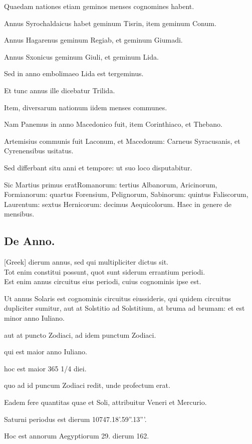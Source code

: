  Quaedam nationes etiam geminos menses cognomines habent.

Annus Syrochaldaicus habet geminum Tisrin, item geminum Conum.

Annus Hagarenus geminum Regiab, et geminum Giumadi.

Annus Sxonicus geminum Giuli, et geminum Lida.

Sed in
anno embolimaeo Lida est tergeminus.

Et tunc annus ille dicebatur
Trilida.

Item, diversarum nationum iidem menses communes.

Nam
Panemus in anno Macedonico fuit, item Corinthiaco, et Thebano.

Artemisius communis fuit Laconum, et Macedonum: Carneus Syracusanis,
et Cyrenensibus usitatus.

Sed differbant situ anni et tempore:
ut suo loco disputabitur.

Sic Martius primus eratRomanorum:
tertius Albanorum, Aricinorum, Formianorum: quartus Forensium,
Pelignorum, Sabinorum: quintus Faliscorum, Laurentum:
sextus Hernicorum: decimus Aequicolorum. Haec in genere
de mensibus.


\subsection{De Anno.}
\setcounter{parcount}{0}

 \textgreek{[Greek]}
 dierum annus, sed qui multipliciter dictus
sit. \\ \p
Tot enim constitui possunt, quot sunt siderum errantium
periodi.\\ \p
Est enim annus circuitus eius periodi, cuius cognominis
ipse est.

Ut annus Solaris est cognominis circuitus eiussideris,
qui quidem circuitus dupliciter sumitur, aut at Solstitio ad Solstitium,
at bruma ad brumam: et est minor anno Iuliano.

aut at puncto Zodiaci,
ad idem punctum Zodiaci.

qui est maior anno Iuliano.

hoc est maior 365 1/4 diei.

quo ad id puncum Zodiaci redit, unde profectum
erat.

Eadem fere quantitas quae et Soli, attribuitur Veneri et Mercurio.

Saturni periodus est dierum 10747.18'.59''.13'''.

Hoc est annorum
Aegyptiorum 29. dierum 162.

